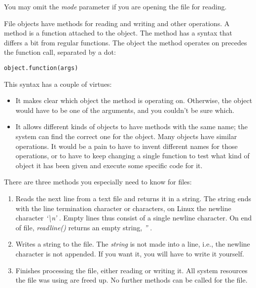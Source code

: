 You may omit the \emph{mode} parameter if you are opening the file for reading.

File objects have methods for
reading and writing and other operations. A method is a function
attached to the object. The method has a syntax that differs a bit from
regular functions. The object the method operates on precedes the
function call, separated by a dot:

\begin{verbatim}
object.function(args)
\end{verbatim}

This syntax has a couple of
virtues:

\begin{itemize}

\item
  It makes clear which object the
  method is operating on. Otherwise, the object would have to be one of
  the arguments, and you couldn't be sure which.
\item
  It allows different kinds of
  objects to have methods with the same name; the system can find the
  correct one for the object. Many objects have similar operations. It
  would be a pain to have to invent different names for those
  operations, or to have to keep changing a single function to test what
  kind of object it has been given and execute some specific code for
  it.
\end{itemize}

There are three methods you
especially need to know for files:

\begin{enumerate}

\item
  Reads the
  next line from a text file and returns it in a string. The string ends
  with the line termination character or characters, on Linux the
  newline character \emph{`\textbackslash{}n'} . Empty lines thus
  consist of a single newline character. On end of file,
  \emph{readline()} returns an empty string, \emph{''} .
\item
  Writes
  a string to the file. The \emph{string} is not made into a line, i.e.,
  the newline character is not appended. If you want it, you will have
  to write it yourself.
\item
  Finishes
  processing the file, either reading or writing it. All system
  resources the file was using are freed up. No further methods can be
  called for the file.
\end{enumerate}

